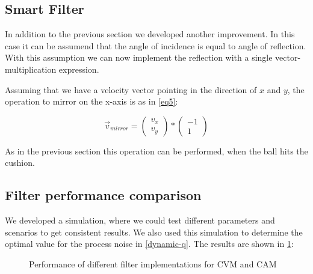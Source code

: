 \documentclass[notitlepage, a4paper, 11pt]{scrartcl}
\begin{document}
\begin{multicols}{2}
\subsection{Smart Filter} \label{smart-filter}

In addition to the previous section we developed another improvement. In this case it can be assumend that the angle of incidence is equal to angle of reflection. 
With this assumption we can now implement the reflection with a single vector-multiplication expression. 

Assuming that we have a velocity vector pointing in the direction of $x$ and $y$, the operation to mirror on the x-axis is as in \cref{eq5}:

\begin{equation} 
    \label{eq5}
    \vec{v}_{mirror} = 
    \left(\!
    \begin{array}{c}
      v_x \\
      v_y
    \end{array}
    \!\right) *
    \left(\!
    \begin{array}{c}
        -1 \\
        1
    \end{array}
    \!\right)
\end{equation}

As in the previous section this operation can be performed, when the ball hits the cushion.


\subsection{Filter performance comparison} \label{perf-comp}

We developed a simulation, where we could test different parameters and scenarios to get consistent results. 
We also used this simulation to determine the optimal value for the process noise in \cref{dynamic-q}. The results are shown in \cref{fig:sim-results}:

\begin{figure}[H]
    \centering
    \caption{Performance of different filter implementations for CVM and CAM}
    \label{fig:sim-results}
\end{figure}


\end{multicols}
\end{document}

